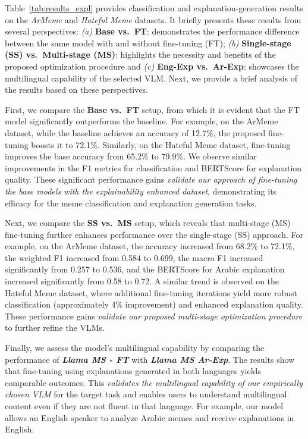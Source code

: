 Table~\ref{tab:results_expl} provides classification and explanation-generation 
results on the \emph{ArMeme} and \emph{Hateful Meme} datasets. It briefly presents these results from several perspectives: \textit{(a)} \textbf{Base vs.~FT}: demonstrates the performance difference between the same model with and without fine-tuning (FT); \textit{(b)} \textbf{Single-stage (SS) vs.~Multi-stage (MS)}: highlights the necessity and benefits of the proposed optimization procedure and \textit{(c)} \textbf{Eng-Exp vs.~Ar-Exp}: showcases the multilingual capability of the selected VLM. Next, we provide a brief analysis of the results based on these perspectives.
%

First, we compare the \textbf{Base vs.~FT} setup, from which it is evident that the FT model significantly outperforms the baseline. For example, on the ArMeme dataset, while the baseline achieves an accuracy of 12.7\%, the proposed fine-tuning boosts it to 72.1\%. Similarly, on the Hateful Meme dataset, fine-tuning improves the base accuracy from 65.2\% to 79.9\%. We observe similar improvements in the F1 metrics for classification and BERTScore for explanation quality. These significant performance gains \textit{validate our approach of fine-tuning the base models with the explainability enhanced dataset}, demonstrating its efficacy for the meme classification and explanation generation tasks.
%

Next, we compare the \textbf{SS vs.~MS} setup, which reveals that multi-stage (MS) fine-tuning further enhances performance over the single-stage (SS) approach. For example, on the ArMeme dataset, the accuracy increased from 68.2\% to 72.1\%, the weighted F1 increased from 0.584 to 0.699, the macro F1 increased significantly from 0.257 to 0.536, and the BERTScore for Arabic explanation increased significantly from 0.58 to 0.72. A similar trend is observed on the Hateful Meme dataset, where additional fine-tuning iterations yield more robust classification (approximately 4\% improvement) and enhanced explanation quality. These performance gains \textit{validate our proposed multi-stage optimization procedure} to further refine the VLMs.
%

Finally, we assess the model’s multilingual capability by comparing the performance of \textbf{\textit{Llama MS - FT}} with \textbf{\textit{Llama MS Ar-Exp}}. The results show that fine-tuning using explanations generated in both languages yields comparable outcomes. This \textit{validates the multilingual capability of our empirically chosen VLM} for the target task and enables users to understand multilingual content even if they are not fluent in that language. For example, our model allows an English speaker to analyze Arabic memes and receive explanations in English.

